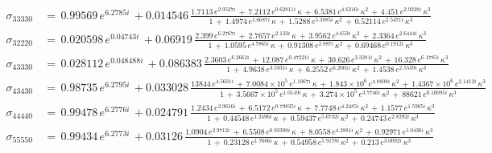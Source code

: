 \begin{align}
  \label{eq:ys33330}
  \sigma_{33330} \, &= \, 0.99569\,e^{6.2785i} \, + 0.014546 \, \frac{ 1.7113\,e^{2.9527i}  \, + \,  7.2112\,e^{0.62811i}\,\kappa \, + \, 6.5381\,e^{4.6216i}\,{\kappa}^{2} \, + \, 4.451\,e^{2.9228i}\,{\kappa}^{3} }{ 1 \, + \,   1.4974\,e^{1.6687i}\,\kappa \, + \, 1.5288\,e^{5.3885i}\,{\kappa}^{2} \, + \, 0.52114\,e^{2.5471i}\,{\kappa}^{3} }   \\
  \label{eq:ys32220}
  \sigma_{32220} \, &= \, 0.020598\,e^{0.04743i} \, + 0.06919 \, \frac{ 2.399\,e^{6.2767i}  \, + \,  2.7657\,e^{2.133i}\,\kappa \, + \, 3.9562\,e^{4.653i}\,{\kappa}^{2} \, + \, 2.3364\,e^{2.6444i}\,{\kappa}^{3} }{ 1 \, + \,   1.0595\,e^{4.7865i}\,\kappa \, + \, 0.91308\,e^{2.887i}\,{\kappa}^{2} \, + \, 0.69468\,e^{0.1912i}\,{\kappa}^{3} }   \\
  \label{eq:ys43330}
  \sigma_{43330} \, &= \, 0.028112\,e^{0.048488i} \, + 0.086383 \, \frac{  2.3603\,e^{6.2662i}  \, + \,  12.087\,e^{0.47221i}\,\kappa \, + \, 30.626\,e^{3.3281i}\,{\kappa}^{2} \, + \, 16.328\,e^{6.1785i}\,{\kappa}^{3} }{ 1 \, + \,   4.9638\,e^{3.5931i}\,\kappa \, + \, 6.2552\,e^{6.2001i}\,{\kappa}^{2} \, + \, 1.4538\,e^{2.5539i}\,{\kappa}^{3} }   \\
  \label{eq:ys43430}
  \sigma_{43430} \, &= \, 0.98735\,e^{6.2795i} \, + 0.033028 \, \frac{ 13844\,e^{4.5601i}  \, + \,  7.0084\times 10^5\,e^{1.1067i}\,\kappa \, + \, 1.843\times 10^6\,e^{4.8808i}\,{\kappa}^{2} \, + \, 1.4367\times 10^6\,e^{2.1412i}\,{\kappa}^{3} }{ 1 \, + \,   3.5667\times 10^5\,e^{1.0149i}\,\kappa \, + \, 3.274\times 10^5\,e^{3.7746i}\,{\kappa}^{2} \, + \, 88621\,e^{0.10095i}\,{\kappa}^{3} }   \\
  \label{eq:ys44440}
  \sigma_{44440} \, &= \, 0.99478\,e^{6.2776i} \, + 0.024791 \, \frac{ 1.2434\,e^{2.9616i}  \, + \,  6.5172\,e^{0.79835i}\,\kappa \, + \, 7.7748\,e^{4.2485i}\,{\kappa}^{2} \, + \, 1.1577\,e^{1.5905i}\,{\kappa}^{3} }{ 1 \, + \,   0.44548\,e^{1.2496i}\,\kappa \, + \, 0.59437\,e^{5.6732i}\,{\kappa}^{2} \, + \, 0.24743\,e^{2.8292i}\,{\kappa}^{3} }   \\
  \label{eq:ys55550}
  \sigma_{55550} \, &= \, 0.99434\,e^{6.2773i} \, + 0.03126 \, \frac{ 1.0904\,e^{2.9712i}  \, + \,  6.5508\,e^{0.93398i}\,\kappa \, + \, 8.0558\,e^{4.2881i}\,{\kappa}^{2} \, + \, 0.92971\,e^{1.0436i}\,{\kappa}^{3} }{ 1 \, + \,   0.23128\,e^{1.7666i}\,\kappa \, + \, 0.54958\,e^{5.9178i}\,{\kappa}^{2} \, + \, 0.213\,e^{3.0092i}\,{\kappa}^{3} }
\end{align}
